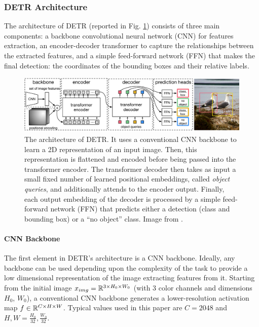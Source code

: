 \subsubsection{DETR Architecture}
\label{sec:detrarchitecture}
The architecture of DETR (reported in Fig. \ref{fig:detrarchiecture}) consists of three main components: a backbone convolutional neural network (CNN) for features extraction, an encoder-decoder transformer to capture the relationships between the extracted features, and a simple feed-forward network (FFN) that makes the final detection: the coordinates of the bounding boxes and their relative labels.

\begin{figure}[h!]
	\centering
	\includegraphics[width=\linewidth]{images/detrarchitecture.pdf}
	\caption{The architecture of DETR. It uses a conventional CNN backbone to learn a 2D representation of an input image. Then, this representation is flattened and encoded before being passed into the transformer encoder. The transformer decoder then takes as input a small fixed number of learned positional embeddings, called \textit{object queries}, and additionally attends to the encoder output. Finally, each output embedding of the decoder is processed by a  simple feed-forward network (FFN) that predicts either a detection (class and bounding box) or a ``no object'' class. Image from \cite{detr}.}
	\label{fig:detrarchiecture}
\end{figure}
\newpage
\paragraph{CNN Backbone} The first element in DETR's architecture is a CNN backbone.  Ideally, any backbone can be used depending upon the complexity of the task to provide a low dimensional representation of the image extracting features from it. Starting from the initial image $x_{img} = \mathbb{R}^{3\times H_0\times W_0}$ (with 3 color channels and dimensions $H_0$, $W_0$), a conventional CNN backbone generates a lower-resolution activation map $f \in \mathbb{R}^{C \times H \times W}$. Typical values used in this paper are $C = 2048$ and $H, W = \frac{H_0}{32}, \frac{W_0}{32}$. 

